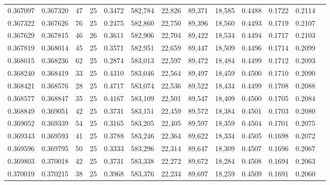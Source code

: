 \begin{tabular}{rrrrrrrrrrrrr}
0.367097 & 0.367320 &    47 &  25 &                                     0.3472 & 582,784 &  22,826 &  89,371 &  18,585 & 0.4488 & 0.1722 & 0.2114 \\
0.367322 & 0.367626 &    76 &  25 &                                     0.2475 & 582,860 &  22,750 &  89,396 &  18,560 & 0.4493 & 0.1719 & 0.2107 \\
0.367629 & 0.367815 &    46 &  26 &                                     0.3611 & 582,906 &  22,704 &  89,422 &  18,534 & 0.4494 & 0.1717 & 0.2103 \\
0.367819 & 0.368014 &    45 &  25 &                                     0.3571 & 582,951 &  22,659 &  89,447 &  18,509 & 0.4496 & 0.1714 & 0.2099 \\
0.368015 & 0.368236 &    62 &  25 &                                     0.2874 & 583,013 &  22,597 &  89,472 &  18,484 & 0.4499 & 0.1712 & 0.2093 \\
0.368240 & 0.368419 &    33 &  25 &                                     0.4310 & 583,046 &  22,564 &  89,497 &  18,459 & 0.4500 & 0.1710 & 0.2090 \\
0.368421 & 0.368576 &    28 &  25 &                                     0.4717 & 583,074 &  22,536 &  89,522 &  18,434 & 0.4499 & 0.1708 & 0.2088 \\
0.368577 & 0.368847 &    35 &  25 &                                     0.4167 & 583,109 &  22,501 &  89,547 &  18,409 & 0.4500 & 0.1705 & 0.2084 \\
0.368849 & 0.369051 &    42 &  25 &                                     0.3731 & 583,151 &  22,459 &  89,572 &  18,384 & 0.4501 & 0.1703 & 0.2080 \\
0.369052 & 0.369339 &    54 &  25 &                                     0.3165 & 583,205 &  22,405 &  89,597 &  18,359 & 0.4504 & 0.1701 & 0.2075 \\
0.369343 & 0.369593 &    41 &  25 &                                     0.3788 & 583,246 &  22,364 &  89,622 &  18,334 & 0.4505 & 0.1698 & 0.2072 \\
0.369596 & 0.369795 &    50 &  25 &                                     0.3333 & 583,296 &  22,314 &  89,647 &  18,309 & 0.4507 & 0.1696 & 0.2067 \\
0.369803 & 0.370018 &    42 &  25 &                                     0.3731 & 583,338 &  22,272 &  89,672 &  18,284 & 0.4508 & 0.1694 & 0.2063 \\
0.370019 & 0.370215 &    38 &  25 &                                     0.3968 & 583,376 &  22,234 &  89,697 &  18,259 & 0.4509 & 0.1691 & 0.2060 \\

\end{tabular}
